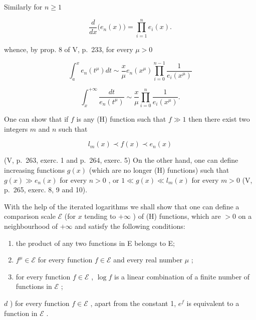 Similarly for \(n\geqslant 1\)

\[
\frac {d}{d x} \big (e _ {n} (x) \big) = \prod_ {i = 1} ^ {n} e _ {i} (x).\tag{8}
\]

whence, by prop. 8 of V, p.~233, for every \(\mu > 0\)

\[
\int_ {a} ^ {x} e _ {n} (t ^ {\mu}) d t \sim \frac {x}{\mu} e _ {n} (x ^ {\mu}) \prod_ {i = 0} ^ {n - 1} \frac {1}{e _ {i} (x ^ {\mu})}\tag{9}
\]

\[
\int_ {x} ^ {+ \infty} \frac {d t}{e _ {n} (t ^ {\mu})} \sim \frac {x}{\mu} \prod_ {i = 0} ^ {n} \frac {1}{e _ {i} (x ^ {\mu})}.\tag{10}
\]

One can show that if \(f\) is any (H) function such that \(f \gg 1\) then there exist two integers \(m\) and \(n\) such that

\[
l _ {m} (x) \prec f (x) \prec e _ {n} (x)
\]

(V, p.~263, exerc. 1 and p.~264, exerc. 5) On the other hand, one can define increasing functions \(g(x)\) (which are no longer (H) functions) such that \(g(x) \gg e_n(x)\) for every \(n > 0\) , or \(1 \ll g(x) \ll l_m(x)\) for every \(m > 0\) (V, p.~265, exerc. 8, 9 and 10).

With the help of the iterated logarithms we shall show that one can define a comparison scale \(\mathcal{E}\) (for \(x\) tending to \(+\infty\) ) of (H) functions, which are \(>0\) on a neighbourhood of \(+\infty\) and satisfy the following conditions:

\begin{enumerate}
\def\labelenumi{\alph{enumi})}
\item
  the product of any two functions in E belongs to E;
\item
  \(f^{\mu} \in \mathcal{E}\) for every function \(f \in \mathcal{E}\) and every real number \(\mu\) ;
\item
  for every function \(f \in \mathcal{E}\) , \(\log f\) is a linear combination of a finite number of functions in \(\mathcal{E}\) ;
\end{enumerate}

\(d\) ) for every function \(f \in \mathcal{E}\) , apart from the constant 1, \(e^f\) is equivalent to a function in \(\mathcal{E}\) .

